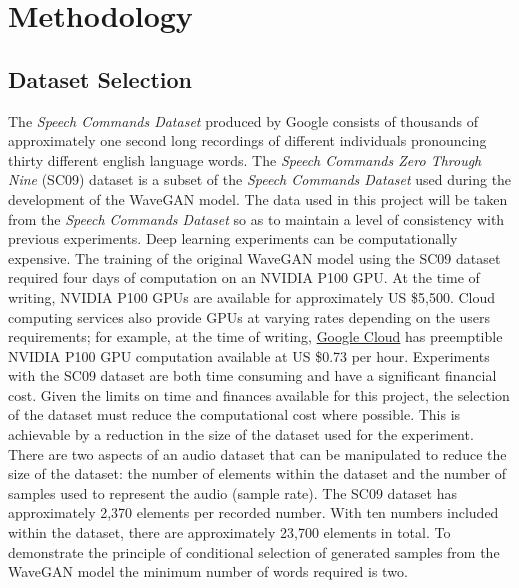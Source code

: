 \documentclass[a4paper, dvipsnames, titlepage]{article}
\begin{document}
\newpage

\section{Methodology}

\subsection{Dataset Selection}

The \textit{Speech Commands Dataset} \citep{speechcommands} produced by Google consists of thousands of approximately one second long recordings of different individuals pronouncing thirty different english language words.
The \textit{Speech Commands Zero Through Nine} (SC09) dataset is a subset of the \textit{Speech Commands Dataset} used during the development of the WaveGAN model.
The data used in this project will be taken from the \textit{Speech Commands Dataset} so as to maintain a level of consistency with previous experiments.
\newline
\newline
Deep learning experiments can be computationally expensive.
The training of the original WaveGAN model using the SC09 dataset required four days of computation on an NVIDIA P100 GPU.
At the time of writing, NVIDIA P100 GPUs are available for approximately US \$5,500.
Cloud computing services also provide GPUs at varying rates depending on the users requirements; for example, at the time of writing, \href{https://cloud.google.com/gpu/}{Google Cloud} has preemptible NVIDIA P100 GPU computation available at US \$0.73 per hour.
Experiments with the SC09 dataset are both time consuming and have a significant financial cost.
\newline
\newline
Given the limits on time and finances available for this project, the selection of the dataset must reduce the computational cost where possible.
This is achievable by a reduction in the size of the dataset used for the experiment.
There are two aspects of an audio dataset that can be manipulated to reduce the size of the dataset: the number of elements within the dataset and the number of samples used to represent the audio (sample rate).
\newline
\newline
The SC09 dataset has approximately 2,370 elements per recorded number.
With ten numbers included within the dataset, there are approximately 23,700 elements in total.
To demonstrate the principle of conditional selection of generated samples from the WaveGAN model the minimum number of words required is two.
\end{document}
